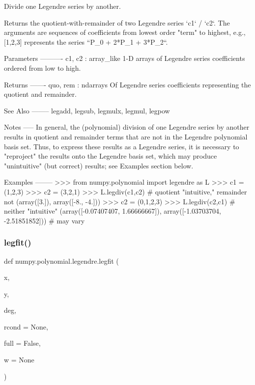 \begin{DoxyVerb}Divide one Legendre series by another.

Returns the quotient-with-remainder of two Legendre series
`c1` / `c2`.  The arguments are sequences of coefficients from lowest
order "term" to highest, e.g., [1,2,3] represents the series
``P_0 + 2*P_1 + 3*P_2``.

Parameters
----------
c1, c2 : array_like
    1-D arrays of Legendre series coefficients ordered from low to
    high.

Returns
-------
quo, rem : ndarrays
    Of Legendre series coefficients representing the quotient and
    remainder.

See Also
--------
legadd, legsub, legmulx, legmul, legpow

Notes
-----
In general, the (polynomial) division of one Legendre series by another
results in quotient and remainder terms that are not in the Legendre
polynomial basis set.  Thus, to express these results as a Legendre
series, it is necessary to "reproject" the results onto the Legendre
basis set, which may produce "unintuitive" (but correct) results; see
Examples section below.

Examples
--------
>>> from numpy.polynomial import legendre as L
>>> c1 = (1,2,3)
>>> c2 = (3,2,1)
>>> L.legdiv(c1,c2) # quotient "intuitive," remainder not
(array([3.]), array([-8., -4.]))
>>> c2 = (0,1,2,3)
>>> L.legdiv(c2,c1) # neither "intuitive"
(array([-0.07407407,  1.66666667]), array([-1.03703704, -2.51851852])) # may vary\end{DoxyVerb}
 \mbox{\label{namespacenumpy_1_1polynomial_1_1legendre_acccd61d38479e586a720116a49d297cc}} 
\subsubsection{\texorpdfstring{legfit()}{legfit()}}
{\footnotesize\ttfamily def numpy.\+polynomial.\+legendre.\+legfit (\begin{DoxyParamCaption}\item[{}]{x,  }\item[{}]{y,  }\item[{}]{deg,  }\item[{}]{rcond = {\ttfamily None},  }\item[{}]{full = {\ttfamily False},  }\item[{}]{w = {\ttfamily None} }\end{DoxyParamCaption})}

